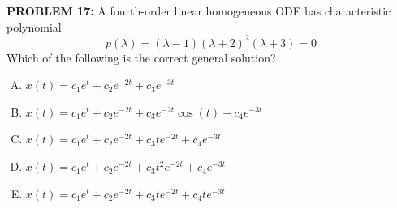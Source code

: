 \documentclass[12pt]{amsart}
\begin{document}
\newpage


{\bf PROBLEM 17:}
%
A fourth-order linear homogeneous ODE has characteristic polynomial
$$p(\lambda) = (\lambda - 1)(\lambda + 2)^2(\lambda + 3) = 0$$
%
Which of the following is the correct general solution?

\begin{enumerate}[(A)]
\item $x(t) = c_1 e^{t} + c_2 e^{-2t} + c_3 e^{-3t}$
\item $x(t) = c_1 e^{t} + c_2 e^{-2t} + c_3 e^{-2t}\cos(t) + c_4 e^{-3t}$
\item $x(t) = c_1 e^{t} + c_2 e^{-2t} + c_3 te^{-2t} + c_4 e^{-3t}$
\item $x(t) = c_1 e^{t} + c_2 e^{-2t} + c_3 t^2 e^{-2t} + c_4 e^{-3t}$
\item $x(t) = c_1 e^{t} + c_2 e^{-2t} + c_3 te^{-2t} + c_4 te^{-3t}$
\end{enumerate}
\end{document}
